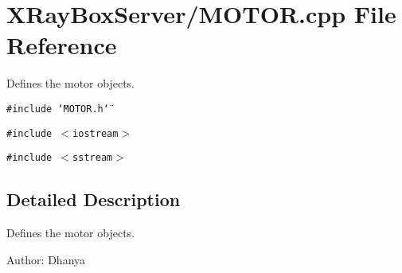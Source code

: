\section{XRay\-Box\-Server/MOTOR.cpp File Reference}
\label{MOTOR_8cpp}
Defines the motor objects. 

{\tt \#include \char`\"{}MOTOR.h\char`\"{}}\par
{\tt \#include $<$iostream$>$}\par
{\tt \#include $<$sstream$>$}\par


\subsection{Detailed Description}
Defines the motor objects. 

\begin{Desc}
\item[Author:]Dhanya \end{Desc}
